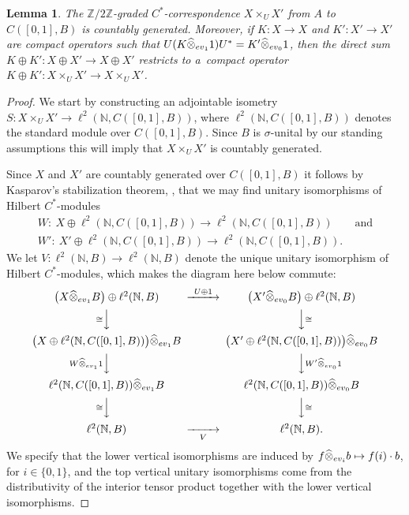 \documentclass[11pt]{article}
\numberwithin{equation}{section}
\newtheorem{lem}[Theorem]{Lemma}
\newcommand{\cd}{\cdot}
\newcommand{\hot}{\widehat \otimes}
\newcommand{\op}{\oplus}
\newcommand{\ti}{\times}
\newcommand{\nn}{\mathbb{N}}
\newcommand{\zz}{\mathbb{Z}}
\newcommand{\si}{\sigma}
\newcommand{\q}{\qquad}
\begin{document}
\begin{lem}\label{l:coucom}
The $\zz/2\zz$-graded $C^*$-correspondence $X \ti_U X'$ from $A$ to $C([0,1],B)$ is countably generated. Moreover, if $K\colon X \to X$ and $K'\colon X' \to X'$ are compact operators such that $U ( K \hot_{{\rm ev}_1} 1) U^* = K' \hot_{{\rm ev}_0} 1$, then the direct sum $K \op K'\colon X \op X' \to X \op X'$ restricts to a~compact operator $K \op K'\colon X \ti_U X' \to X \ti_U X'$.
\end{lem}
\begin{proof}
We start by constructing an adjointable isometry $S\colon X \ti_U X' \to \ell^2(\nn, C([0,1],B))$, where $\ell^2(\nn,C([0,1],B))$ denotes the standard module over $C([0,1],B)$. Since $B$ is $\si$-unital by our standing assumptions this will imply that $X \ti_U X'$ is countably generated.

Since $X$ and $X'$ are countably generated over $C([0,1],B)$ it follows by Kasparov's stabilization theorem, \cite[Theorem 2]{Kas:HSV}, that we may find unitary isomorphisms of Hilbert $C^*$-modules
\begin{gather*}
W\colon \ X \op \ell^2(\nn, C([0,1],B)) \to \ell^2(\nn,C([0,1],B)) \q \text{and} \\
W'\colon \ X' \op \ell^2(\nn, C([0,1],B)) \to \ell^2(\nn,C([0,1],B)) .
\end{gather*}
We let $V\colon \ell^2(\nn,B) \to \ell^2(\nn,B)$ denote the unique unitary isomorphism of Hilbert $C^*$-modules, which makes the diagram here below commute:
\[
\begin{CD}
\big( X \hot_{{\rm ev}_1} B \big) \op \ell^2(\nn,B) @>{ U \op 1}>> \big( X' \hot_{{\rm ev}_0} B \big) \op \ell^2(\nn,B) \\
@V{\cong}VV @VV{\cong}V \\
\big( X \op \ell^2(\nn, C( [0,1],B)) \big) \hot_{{\rm ev}_1} B & & \big( X' \op \ell^2(\nn, C( [0,1],B)) \big) \hot_{{\rm ev}_0} B \\
@V{W \hot_{{\rm ev}_1} 1}VV @VV{W' \hot_{{\rm ev}_0} 1}V \\
\ell^2(\nn,C( [0,1],B)) \hot_{{\rm ev}_1} B & & \ell^2(\nn,C( [0,1],B)) \hot_{{\rm ev}_0} B \\
@V{\cong}VV @VV{\cong}V \\
\ell^2(\nn,B) @>>{V}> \ell^2(\nn,B).
\end{CD}
\]
We specify that the lower vertical isomorphisms are induced by $f \hot_{{\rm ev}_i} b \mapsto f(i) \cd b$, for $i \in \{0,1\}$, and the top vertical unitary isomorphisms come from the distributivity of the interior tensor product together with the lower vertical isomorphisms.


\end{proof}
\end{document}
